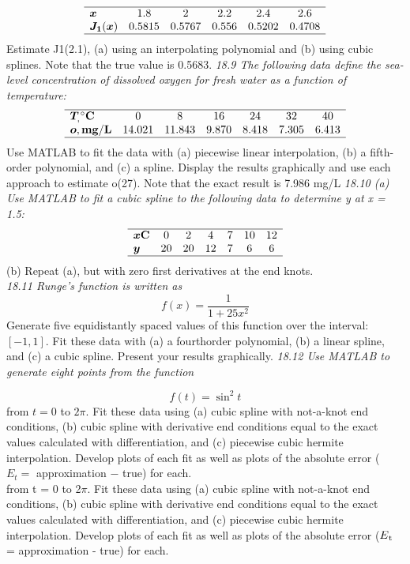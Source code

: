\documentclass[../main.tex]{subfiles}
\begin{document}
\begin{multicols}{2}
$$
        \begin{array}{lcccccc}
            \hline \boldsymbol{x} & 1.8 & 2 & 2.2 & 2.4 & 2.6 \\
            \boldsymbol{J}_{\mathbf{1}}(\boldsymbol{x}) & 0.5815 & 0.5767 & 0.556 & 0.5202 & 0.4708 \\
            \hline
        \end{array}
$$
Estimate J1(2.1), (a) using an interpolating polynomial and
(b) using cubic splines. Note that the true value is 0.5683.
\noindent\textit{18.9 The following data define the sea-level concentration of dissolved oxygen for fresh water as a function of
temperature:}
$$
\begin{array}{lcccccc}
    \hline \boldsymbol{T}_{,}{ }^{\circ} \mathbf{C} & 0 & 8 & 16 & 24 & 32 & 40 \\
    \boldsymbol{o}, \mathbf{m g} / \mathbf{L} & 14.021 & 11.843 & 9.870 & 8.418 & 7.305 & 6.413 \\
    \hline
    \end{array}
$$
    Use MATLAB to fit the data with (a) piecewise linear interpolation, (b) a fifth-order polynomial, and (c) a spline. Display the results graphically and use each approach to estimate
    o(27). Note that the exact result is 7.986 mg/L
\noindent\textit{18.10 (a) Use MATLAB to fit a cubic spline to the following data to determine y at x = 1.5:}
$$
\begin{array}{lcccccc}
    \hline \boldsymbol{x} \mathbf{C} & 0 & 2 & 4 & 7 & 10 & 12 \\
    \boldsymbol{y} & 20 & 20 & 12 & 7 & 6 & 6 \\
    \hline
    \end{array}
$$
(b) Repeat (a), but with zero first derivatives at the end
knots.\\
\noindent\textit{18.11 Runge's function is written as
}
$$
f(x)=\frac{1}{1+25 x^{2}}
$$
Generate five equidistantly spaced values of this function over the interval: $[-1,1]$. Fit these data with (a) a fourthorder polynomial, (b) a linear spline, and (c) a cubic spline. Present your results graphically.
\noindent\textit{18.12 Use MATLAB to generate eight points from the function}

$$
f(t)=\sin ^{2} t
$$
from $t=0$ to $2 \pi$. Fit these data using (a) cubic spline with not-a-knot end conditions, (b) cubic spline with derivative end conditions equal to the exact values calculated with differentiation, and (c) piecewise cubic hermite interpolation. Develop plots of each fit as well as plots of the absolute error ( $E_{t}=$ approximation $-$ true) for each.\\
from t = 0 to 2$\pi$. Fit these data using (a) cubic spline with
not-a-knot end conditions, (b) cubic spline with derivative
end conditions equal to the exact values calculated with differentiation, and (c) piecewise cubic hermite interpolation.
Develop plots of each fit as well as plots of the absolute error
($E\textsubscript{t}$ = approximation - true) for each.


\end{multicols}
\end{document}
